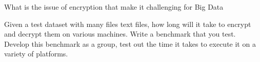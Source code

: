 \begin{exercise}
  \label{E:Encryption.4} What is the issue of encryption that make it
  challenging for Big Data
\end{exercise}

\begin{exercise}
  \label{E:Encryption.5} Given a test dataset with many files text
  files, how long will it take to encrypt and decrypt them on various
  machines. Write a benchmark that you test. Develop this benchmark as
  a group, test out the time it takes to execute it on a variety of
  platforms.
\end{exercise}
